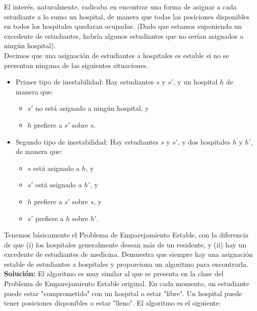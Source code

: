 \documentclass{article}
\begin{document}
El interés, naturalmente, radicaba en encontrar una forma de asignar a cada estudiante a lo sumo un hospital, de manera que todas las posiciones disponibles en todos los hospitales quedaran ocupadas. (Dado que estamos suponiendo un excedente de estudiantes, habría algunos estudiantes que no serían asignados a ningún hospital).\\

Decimos que una asignación de estudiantes a hospitales es estable si no se presentan ninguna de las siguientes situaciones.\\

\begin{itemize}
  \item Primer tipo de inestabilidad: Hay estudiantes $s$ y $s'$, y un hospital $h$ de manera que:
  \begin{itemize}
      \item $s'$ no está asignado a ningún hospital, y
      \item $h$ prefiere a $s'$ sobre $s$.
  \end{itemize}
  \item Segundo tipo de inestabilidad: Hay estudiantes $s$ y $s'$, y dos hospitales $h$ y $h'$, de manera que:
  \begin{itemize}
      \item $s$ está asignado a $h$, y
      \item $s'$ está asignado a $h'$, y
      \item $h$ prefiere a $s'$ sobre $s$, y
      \item $s'$ prefiere a $h$ sobre $h'$.
  \end{itemize}
\end{itemize}

Tenemos básicamente el Problema de Emparejamiento Estable, con la diferencia de que (i) los hospitales generalmente desean más de un residente, y (ii) hay un excedente de estudiantes de medicina.
Demuestra que siempre hay una asignación estable de estudiantes a hospitales y proporciona un algoritmo para encontrarla.\\

\textbf{Solución:}
El algoritmo es muy similar al que se presenta en la clase del Problema de Emparejamiento Estable original. En cada momento, un estudiante puede estar "comprometido" con un hospital o estar "libre". Un hospital puede tener posiciones disponibles o estar "lleno". El algoritmo es el siguiente:\\
\end{document}
